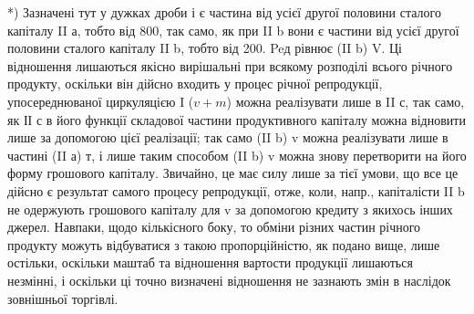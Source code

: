 *) Зазначені тут у дужках дроби  і  є частина від усієї другої половини
сталого капіталу II а, тобто від 800, так само, як при II b вони є частини від усієї
другої половини сталого капіталу II b, тобто від 200. Peд
рівнює (II b) V. Ці відношення лишаються якісно вирішальні при всякому
розподілі всього річного продукту, оскільки він дійсно входить у процес
річної репродукції, упосереднюваної циркуляцією I ($v + m$) можна реалізувати
лише в II с, так само, як ІІ с в його функції складової частини
продуктивного капіталу можна відновити лише за допомогою цієї реалізації;
так само (II b) v можна реалізувати лише в частині (II а) т, і лише
таким способом (II b) v можна знову перетворити на його форму грошового
капіталу. Звичайно, це має силу лише за тієї умови, що все це дійсно
є результат самого процесу репродукції, отже, коли, напр., капіталісти
II b не одержують грошового капіталу для v за допомогою кредиту з
якихось інших джерел. Навпаки, щодо кількісного боку, то обміни різних
частин річного продукту можуть відбуватися з такою пропорційністю, як
подано вище, лише остільки, оскільки маштаб та відношення вартости
продукції лишаються незмінні, і оскільки ці точно визначені відношення
не зазнають змін в наслідок зовнішньої торгівлі.

